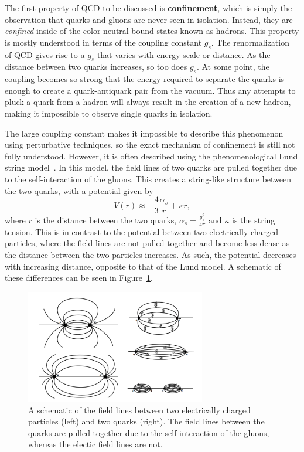 The first property of QCD to be discussed is \textbf{confinement}, which is simply the observation that quarks and gluons are never seen in isolation. Instead, they are \textit{confined} inside of the color neutral bound states known as hadrons. This property is mostly understood in terms of the coupling constant $g_{s}$. The renormalization~\cite{QCDRenorm} of QCD gives rise to a $g_{s}$ that varies with energy scale or distance. As the distance between two quarks increases, so too does $g_{s}$. At some point, the coupling becomes so strong that the energy required to separate the quarks is enough to create a quark-antiquark pair from the vacuum. Thus any attempts to pluck a quark from a hadron will always result in the creation of a new hadron, making it impossible to observe single quarks in isolation. 

The large coupling constant makes it impossible to describe this phenomenon using perturbative techniques, so the exact mechanism of confinement is still not fully understood. However, it is often described using the phenomenological Lund string model~\cite{LundString}. In this model, the field lines of two quarks are pulled together due to the self-interaction of the gluons. This creates a string-like structure between the two quarks, with a potential given by 
%
\begin{equation}
    \label{eq:lund_potential}
    V(r) \approx -\frac{4}{3}\frac{\alpha_s}{r} + \kappa r,
\end{equation}
%
where $r$ is the distance between the two quarks, $\alpha_s = \frac{g_s^2}{4\pi}$ and $\kappa$ is the string tension. This is in contrast to the potential between two electrically charged particles, where the field lines are not pulled together and become less dense as the distance between the two particles increases. As such, the potential decreases with increasing distance, opposite to that of the Lund model. A schematic of these differences can be seen in Figure~\ref{fig:field_line_differences}.

\begin{figure}[ht]
    \centering
    \includegraphics[width=0.7\textwidth]{figures/introduction/electric_color_fields.png}
    \caption{A schematic of the field lines between two electrically charged particles (left) and two quarks (right). The field lines between the quarks are pulled together due to the self-interaction of the gluons, whereas the electic field lines are not.}
    \label{fig:field_line_differences}
\end{figure}

